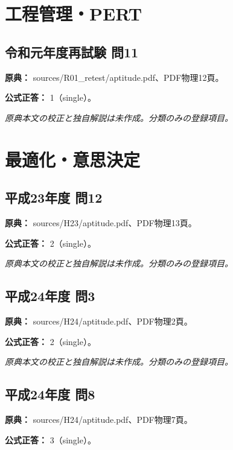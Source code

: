 \section{工程管理・PERT}

\subsection{令和元年度再試験 問11}
\label{q:r01-ret-apt-11}

\noindent\textbf{原典：} sources/R01\_retest/aptitude.pdf、PDF物理12頁。

\textbf{公式正答：} 1（single）。

\par\textit{原典本文の校正と独自解説は未作成。分類のみの登録項目。}

\section{最適化・意思決定}

\subsection{平成23年度 問12}
\label{q:h23-reg-apt-12}

\noindent\textbf{原典：} sources/H23/aptitude.pdf、PDF物理13頁。

\textbf{公式正答：} 2（single）。

\par\textit{原典本文の校正と独自解説は未作成。分類のみの登録項目。}

\subsection{平成24年度 問3}
\label{q:h24-reg-apt-03}

\noindent\textbf{原典：} sources/H24/aptitude.pdf、PDF物理2頁。

\textbf{公式正答：} 2（single）。

\par\textit{原典本文の校正と独自解説は未作成。分類のみの登録項目。}

\subsection{平成24年度 問8}
\label{q:h24-reg-apt-08}

\noindent\textbf{原典：} sources/H24/aptitude.pdf、PDF物理7頁。

\textbf{公式正答：} 3（single）。

